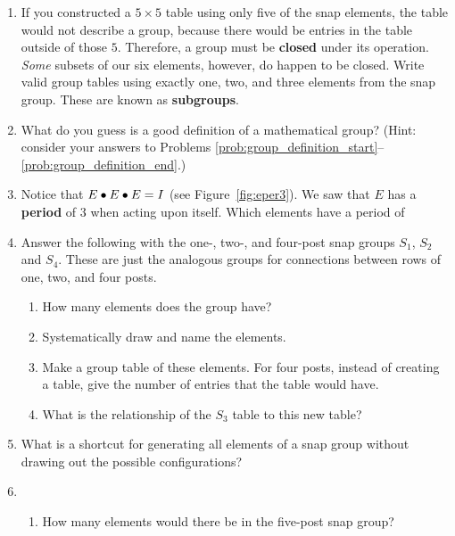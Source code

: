 \documentclass[../textbook.tex]{subfiles}
\begin{document}
\begin{enumerate}
\setcounter{enumi}{\value{some_name}}
\item If you constructed a $5\times 5$ table using only five of the snap elements, the table would not describe a group, because there would be entries in the table outside of those $5$. Therefore, a group must be \textbf{closed} under its operation. \textit{Some} subsets of our six elements, however, do happen to be closed. Write valid group tables using exactly one, two, and three elements from the snap group. These are known as \textbf{subgroups}.\label{prob:group_definition_end}
\item What do you guess is a good definition of a mathematical group? (Hint: consider your answers to Problems \ref{prob:group_definition_start}--\ref{prob:group_definition_end}.)
\item Notice that $E\bullet E\bullet E=I$ (see Figure~\ref{fig:eper3}). We saw that $E$ has a \textbf{period} of $3$ when acting upon itself. Which elements have a period of
\begin{enumerate}
\end{enumerate}
\item Answer the following with the one-, two-, and four-post snap groups $S_1$, $S_2$ and $S_4$. These are just the analogous groups for connections between rows of one, two, and four posts. \begin{enumerate}
\item How many elements does the group have?
\item Systematically draw and name the elements.
\item Make a group table of these elements. For four posts, instead of creating a table, give the number of entries that the table would have.
\item What is the relationship of the $S_3$ table to this new table?
\end{enumerate}
\item What is a shortcut for generating all elements of a snap group without drawing out the possible configurations?
\item \begin{enumerate}
\item How many elements would there be in the five-post snap group? \label{prob:five_post_snap_list_start}

\end{enumerate}
\end{enumerate}
\end{document}
